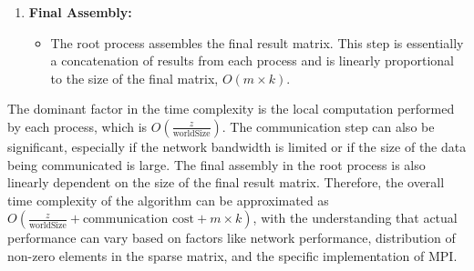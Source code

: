 \documentclass[12pt,oneside]{book} %
\begin{document}
\begin{enumerate}
    \item \textbf{Final Assembly:}
          \begin{itemize}
              \item The root process assembles the final result matrix. This step is essentially a
                    concatenation of results from each process and is linearly proportional to the
                    size of the final matrix, \( O(m \times k) \).
          \end{itemize}
\end{enumerate}

The dominant factor in the time complexity is the local computation performed
by each process, which is \( O\left(\frac{z}{\text{worldSize}}\right) \). The
communication step can also be significant, especially if the network bandwidth
is limited or if the size of the data being communicated is large. The final
assembly in the root process is also linearly dependent on the size of the
final result matrix. Therefore, the overall time complexity of the algorithm
can be approximated as \( O\left(\frac{z}{\text{worldSize}} +
\text{communication cost} + m \times k\right) \), with the understanding that
actual performance can vary based on factors like network performance,
distribution of non-zero elements in the sparse matrix, and the specific
implementation of MPI.
\end{document}
